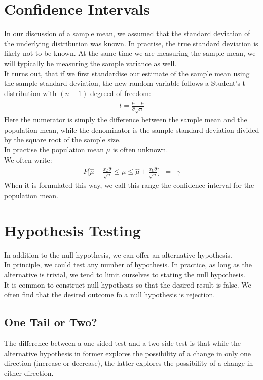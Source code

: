 \section{Confidence Intervals}
In our discussion of a sample mean, we assumed that the standard deviation of the underlying distribution was known. In practise, the true standard deviation is likely not to be known. At the same time we are measuring the sample mean, we will typically be measuring the sample variance as well.\\
It turns out, that if we first standardise our estimate of the sample mean using the sample standard deviation, the new random variable follows a Student's t distribution with $(n - 1)$ degreed of freedom:
\begin{eqnarray}
	t = \frac{\hat{\mu} - \mu}{\hat{\sigma}\sqrt{n}}
\end{eqnarray}
Here the numerator is simply the difference between the sample mean and the population mean, while the denominator is the sample standard deviation divided by the square root of the sample size.\\
In practise the population mean $\mu$ is often unknown.\\
We often write:
\begin{eqnarray}
	P\bigg[\hat{\mu} - \frac{x_{L}\hat{\sigma}}{\sqrt{n}} \leq\mu\leq\hat{\mu} + \frac{x_{U}\hat{\sigma}}{\sqrt{n}}\bigg] &=& \gamma
\end{eqnarray}
When it is formulated this way, we call this range the confidence interval for the population mean.


\section{Hypothesis Testing}
In addition to the null hypothesis, we can offer an alternative hypothesis.\\
In principle, we could test any number of hypothesis. In practice, as long as the alternative is trivial, we tend to limit ourselves to stating the null hypothesis.\\
It is common to construct null hypothesis so that the desired result is false. We often find that the desired outcome fo a null hypothesis is rejection.


\subsection{One Tail or Two?}
The difference between a one-sided test and a two-side test is that while the alternative hypothesis in former explores the possibility of a change in only one direction (increase or decrease), the latter explores the possibility of a change in either direction.


